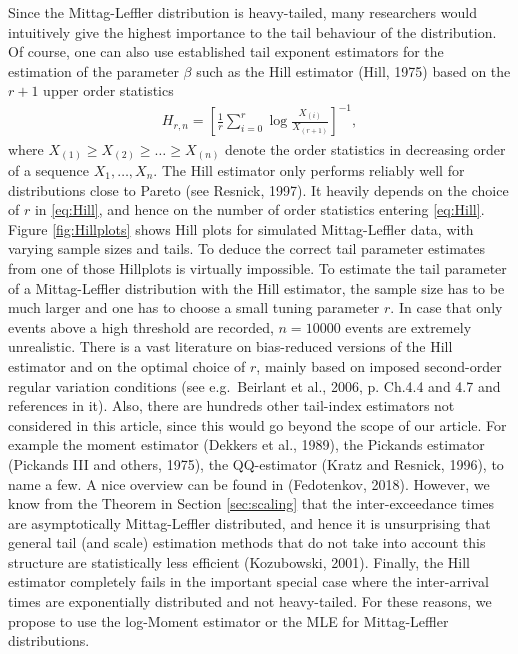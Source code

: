 \documentclass[]{elsarticle} %
\begin{document}
Since the Mittag-Leffler distribution is heavy-tailed, many researchers
would intuitively give the highest importance to the tail behaviour of
the distribution. Of course, one can also use established tail exponent
estimators for the estimation of the parameter \(\beta\) such as the
Hill estimator (Hill, 1975) based on the \(r+1\) upper order statistics
\begin{align}\label{eq:Hill}
H_{r,n}=\left[ \frac{1}{r} \sum_{i=0}^{r} \log \frac{X_{(i)}}{X_{(r+1)}}\right]^{-1}, 
\end{align} where \(X_{(1)} \geq X_{(2)} \geq \ldots \geq X_{(n)}\)
denote the order statistics in decreasing order of a sequence
\(X_1,\ldots,X_n\). The Hill estimator only performs reliably well for
distributions close to Pareto (see Resnick, 1997). It heavily depends on
the choice of \(r\) in \eqref{eq:Hill}, and hence on the number of order
statistics entering \eqref{eq:Hill}. Figure \ref{fig:Hillplots} shows
Hill plots for simulated Mittag-Leffler data, with varying sample sizes
and tails. To deduce the correct tail parameter estimates from one of
those Hillplots is virtually impossible. To estimate the tail parameter
of a Mittag-Leffler distribution with the Hill estimator, the sample
size has to be much larger and one has to choose a small tuning
parameter \(r\). In case that only events above a high threshold are
recorded, \(n=10000\) events are extremely unrealistic. There is a vast
literature on bias-reduced versions of the Hill estimator and on the
optimal choice of \(r\), mainly based on imposed second-order regular
variation conditions (see e.g.~Beirlant et al., 2006, p. Ch.4.4 and 4.7
and references in it). Also, there are hundreds other tail-index
estimators not considered in this article, since this would go beyond
the scope of our article. For example the moment estimator (Dekkers et
al., 1989), the Pickands estimator (Pickands III and others, 1975), the
QQ-estimator (Kratz and Resnick, 1996), to name a few. A nice overview
can be found in (Fedotenkov, 2018). However, we know from the Theorem in
Section \ref{sec:scaling} that the inter-exceedance times are
asymptotically Mittag-Leffler distributed, and hence it is unsurprising
that general tail (and scale) estimation methods that do not take into
account this structure are statistically less efficient (Kozubowski,
2001). Finally, the Hill estimator completely fails in the important
special case where the inter-arrival times are exponentially distributed
and not heavy-tailed. For these reasons, we propose to use the
log-Moment estimator or the MLE for Mittag-Leffler distributions.
\end{document}
